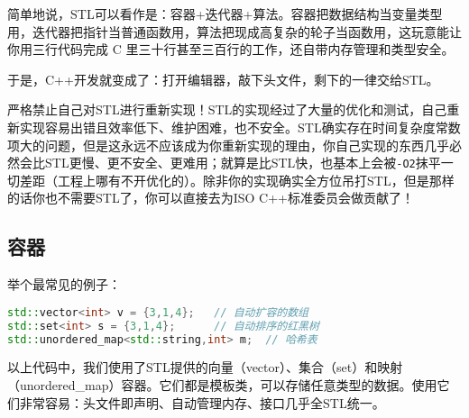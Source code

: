简单地说，STL可以看作是：容器+迭代器+算法。容器把数据结构当变量类型用，迭代器把指针当普通函数用，算法把现成高复杂的轮子当函数用，这玩意能让你用三行代码完成 C 里三十行甚至三百行的工作，还自带内存管理和类型安全。

于是，C++开发就变成了：打开编辑器，敲下头文件，剩下的一律交给STL。

\begin{warning}
    严格禁止自己对STL进行重新实现！STL的实现经过了大量的优化和测试，自己重新实现容易出错且效率低下、维护困难，也不安全。STL确实存在时间复杂度常数项大的问题，但是这永远不应该成为你重新实现的理由，你自己实现的东西几乎必然会比STL更慢、更不安全、更难用；就算是比STL快，也基本上会被\texttt{-O2}抹平一切差距（工程上哪有不开优化的）。除非你的实现确实全方位吊打STL，但是那样的话你也不需要STL了，你可以直接去为ISO C++标准委员会做贡献了！
\end{warning}

\subsection{容器}

举个最常见的例子：
\begin{lstlisting}[language=C++]
std::vector<int> v = {3,1,4};   // 自动扩容的数组
std::set<int> s = {3,1,4};      // 自动排序的红黑树
std::unordered_map<std::string,int> m;  // 哈希表
\end{lstlisting}
以上代码中，我们使用了STL提供的向量（vector）、集合（set）和映射（unordered\_map）容器。它们都是模板类，可以存储任意类型的数据。使用它们非常容易：头文件即声明、自动管理内存、接口几乎全STL统一。

